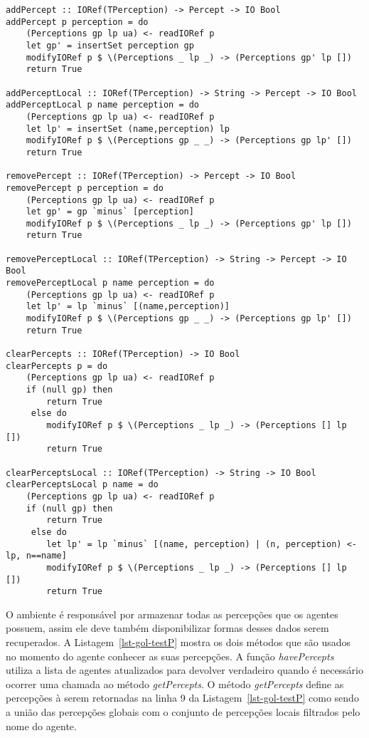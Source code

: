 \lstset{linewidth=140mm}
\begin{center}
    \begin{minipage}{140mm}
	\begin{lstlisting}[frame=trbl, caption=Métodos relativos às percepções.,label=lst-gol-arcP]
addPercept :: IORef(TPerception) -> Percept -> IO Bool
addPercept p perception = do
    (Perceptions gp lp ua) <- readIORef p
    let gp' = insertSet perception gp
    modifyIORef p $ \(Perceptions _ lp _) -> (Perceptions gp' lp [])
    return True

addPerceptLocal :: IORef(TPerception) -> String -> Percept -> IO Bool
addPerceptLocal p name perception = do
    (Perceptions gp lp ua) <- readIORef p
    let lp' = insertSet (name,perception) lp
    modifyIORef p $ \(Perceptions gp _ _) -> (Perceptions gp lp' [])
    return True

removePercept :: IORef(TPerception) -> Percept -> IO Bool
removePercept p perception = do
    (Perceptions gp lp ua) <- readIORef p
    let gp' = gp `minus` [perception]
    modifyIORef p $ \(Perceptions _ lp _) -> (Perceptions gp' lp [])
    return True

removePerceptLocal :: IORef(TPerception) -> String -> Percept -> IO Bool
removePerceptLocal p name perception = do
    (Perceptions gp lp ua) <- readIORef p
    let lp' = lp `minus` [(name,perception)]
    modifyIORef p $ \(Perceptions gp _ _) -> (Perceptions gp lp' [])
    return True

clearPercepts :: IORef(TPerception) -> IO Bool
clearPercepts p = do
    (Perceptions gp lp ua) <- readIORef p
    if (null gp) then
        return True
     else do
        modifyIORef p $ \(Perceptions _ lp _) -> (Perceptions [] lp [])
        return True

clearPerceptsLocal :: IORef(TPerception) -> String -> IO Bool
clearPerceptsLocal p name = do
    (Perceptions gp lp ua) <- readIORef p
    if (null gp) then
        return True
     else do
        let lp' = lp `minus` [(name, perception) | (n, perception) <- lp, n==name]
        modifyIORef p $ \(Perceptions _ lp _) -> (Perceptions [] lp [])
        return True
	\end{lstlisting}
    \end{minipage}
\end{center}

O ambiente é responsável por armazenar todas as percepções que os agentes
possuem, assim ele deve também disponibilizar formas desses dados serem
recuperados. A Listagem~\ref{lst-gol-testP} mostra os dois métodos que são
usados no momento do agente conhecer as suas percepções. A função
\emph{havePercepts} utiliza a lista de agentes atualizados para devolver
verdadeiro quando é necessário ocorrer uma chamada ao método
\emph{getPercepts}. O  método \emph{getPercepts} define as percepções à
serem retornadas na linha 9 da Listagem~\ref{lst-gol-testP} como sendo a
união das percepções globais com o conjunto de percepções locais filtrados
pelo nome do agente.

